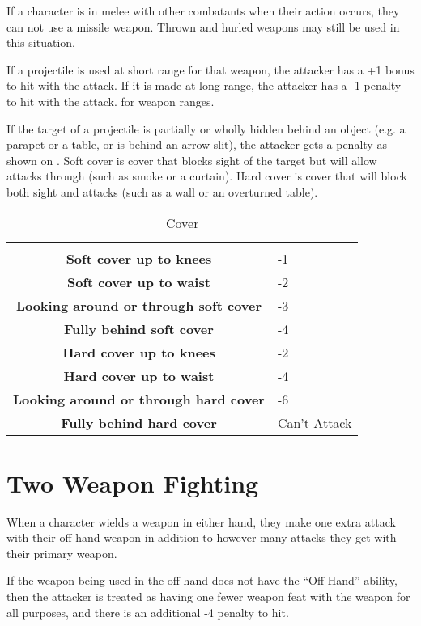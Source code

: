 \begin{multicols*}{2}
If a character is in melee with other combatants when their action occurs, they can not use a missile weapon. Thrown and hurled weapons may still be used in this situation.

If a projectile is used at short range for that weapon, the attacker has a +1 bonus to hit with the attack. If it is made at long range, the attacker has a -1 penalty to hit with the attack.  for weapon ranges.

If the target of a projectile is partially or wholly hidden behind an object (e.g. a parapet or a table, or is behind an arrow slit), the attacker gets a penalty as shown on . Soft cover is cover that blocks sight of the target but will allow attacks through (such as smoke or a curtain). Hard cover is cover that will block both sight and attacks (such as a wall or an overturned table).

\begin {table}[H]
	\caption{Cover}\label{tab:Cover}
  \begin{tabularx}{\columnwidth}{>{\bfseries}cY}
	 & \\
	Soft cover up to knees & -1\\
	Soft cover up to waist & -2\\
	Looking around or through soft cover & -3\\
	Fully behind soft cover & -4\\
	Hard cover up to knees & -2\\
	Hard cover up to waist & -4\\
	Looking around or through hard cover & -6\\
	Fully behind hard cover & Can’t Attack
  \end {tabularx}
\end {table}

\section{Two Weapon Fighting}
When a character wields a weapon in either hand, they make one extra attack with their off hand weapon in addition to however many attacks they get with their primary weapon.

If the weapon being used in the off hand does not have the “Off Hand” ability, then the attacker is treated as having one fewer weapon feat with the weapon for all purposes, and there is an additional -4 penalty to hit.


\end{multicols*}
